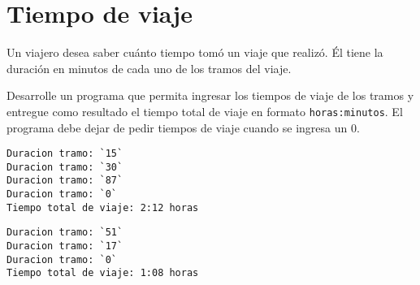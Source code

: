 \section{Tiempo de viaje}

Un viajero desea saber cuánto tiempo tomó un viaje que realizó. Él tiene
la duración en minutos de cada uno de los tramos del viaje.

Desarrolle un programa que permita ingresar los tiempos de viaje de los
tramos y entregue como resultado el tiempo total de viaje en formato
\lstinline!horas:minutos!.
El programa debe dejar de pedir tiempos de viaje cuando se ingresa un 0.

\begin{lstlisting}[language=testcase]
Duracion tramo: `15`
Duracion tramo: `30`
Duracion tramo: `87`
Duracion tramo: `0`
Tiempo total de viaje: 2:12 horas
\end{lstlisting}

\begin{lstlisting}[language=testcase]
Duracion tramo: `51`
Duracion tramo: `17`
Duracion tramo: `0`
Tiempo total de viaje: 1:08 horas
\end{lstlisting}

